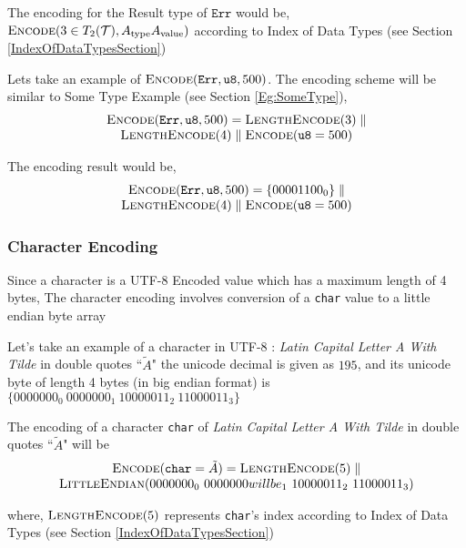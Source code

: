 \documentclass[../alan-handbook.tex]{subfiles}
\begin{document}
The encoding for the Result type of $\texttt{Err}$ would be, $\Call{Encode}{3 \in T_2(\mathcal{T}), A_{\text{type}}  A_{\text{value}}}$ according to Index of Data Types (see Section \ref{IndexOfDataTypesSection})

Lets take an example of $\Call{Encode}{\texttt{Err},\texttt{u8}, 500}$. The encoding scheme will be similar to Some Type Example (see Section \ref{Eg:SomeType}),
$$
\begin{matrix}
    \Call{Encode}{\texttt{Err},\texttt{u8}, 500} = \Call{LengthEncode}{3} \parallel \\ 
    \Call{LengthEncode}{4} \parallel \Call{Encode}{\texttt{u8}=500}
\end{matrix}
$$

The encoding result would be,
$$
\begin{matrix}
    \Call{Encode}{\texttt{Err},\texttt{u8}, 500} = \{00001100_0\} \parallel \\ 
    \Call{LengthEncode}{4} \parallel \Call{Encode}{\texttt{u8}=500}
\end{matrix}
$$

\subsubsection{Character Encoding} \label{Eg:CharacterEncoding}

Since a character is a UTF-8 Encoded value which has a maximum length of 4 bytes, The character encoding involves conversion of a \texttt{char} value to a little endian byte array 

Let's take an example of a character in UTF-8 : \textit{Latin Capital Letter A With Tilde} in double quotes ``$\tilde{A}$" the unicode decimal is given as $195$, and its unicode byte of length 4 bytes (in big endian format) is $\{0000000_0 \ 0000000_1 \ 10000011_2 \ 11000011_3\}$

The encoding of a character \texttt{char} of \textit{Latin Capital Letter A With Tilde} in double quotes ``$\tilde{A}$" will be
$$
\begin{matrix}
    \Call{Encode}{\texttt{char} = \tilde{A}} = \Call{LengthEncode}{5} \parallel \\
    \Call{LittleEndian}{0000000_0 \ 0000000will be_1 \ 10000011_2 \ 11000011_3}
\end{matrix}
$$

where, $\Call{LengthEncode}{5}$ represents \texttt{char}'s index according to Index of Data Types (see Section \ref{IndexOfDataTypesSection})
\end{document}
